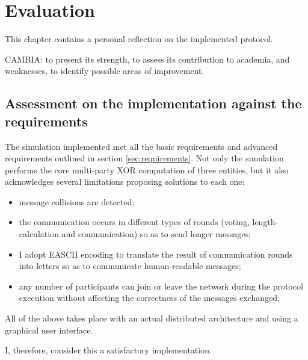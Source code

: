 \chapter{Evaluation}



This chapter contains a personal reflection on the implemented protocol. 

CAMBIA: to present its strength, to assess its contribution to academia,  and weaknesses, to identify possible areas of improvement. 

\section{Assessment on the implementation against the requirements}
The simulation implemented met all the basic requirements and advanced requirements outlined in section \ref{sec:requirements}. Not only the simulation performs the core multi-party XOR computation of three entities, but it also acknowledges several limitations proposing solutions to each one:
\begin{itemize}
    \item message collisions are detected;
    \item the communication occurs in different types of rounds (voting, length-calculation and communication) so as to send longer messages;
    \item I adopt EASCII encoding to translate the result of communication rounds into letters so as to communicate human-readable messages;
    \item any number of participants can join or leave the network during the protocol execution without affecting the correctness of the messages exchanged;
\end{itemize}
All of the above takes place with an actual distributed architecture and using a graphical user interface.

I, therefore, consider this a satisfactory implementation.


